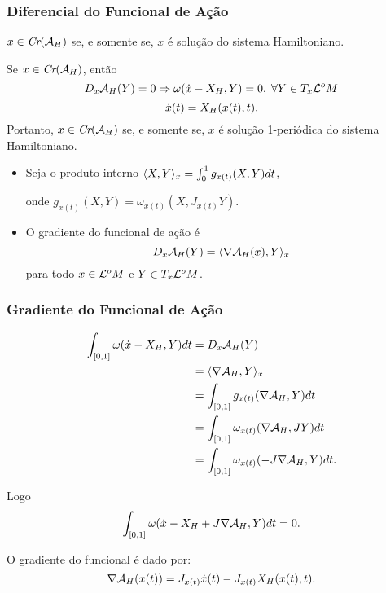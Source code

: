 \documentclass{beamer}
\begin{document}
\begin{footnotesize}
	\begin{frame}
				\frametitle{Diferencial do Funcional de Ação}
		\begin{proposicao}
			$x \in \textit{Cr}(\mathcal{A}_{H})$ se, e somente se, $x$ é solução do sistema Hamiltoniano.
		\end{proposicao}
		\begin{prova}
			Se $x \in \textit{Cr}(\mathcal{A}_{H})$, então
			$$
			D_{x}\mathcal{A}_{H}(Y) = 0 \Rightarrow \omega(\dot{x} - X_{H}, Y)=0,\; \forall Y \in T_{x}\mathcal{L}^{o}M
			$$
			$$
			\dot{x}(t) =X_{H}(x(t), t).
			$$
			Portanto, $x \in \textit{Cr}(\mathcal{A}_{H})$ se, e somente se, $x$ é solução 1-periódica do sistema Hamiltoniano. 
		\end{prova}
		\begin{itemize}
			\item 
			Seja o produto interno $ \langle X, Y \rangle_{x} = \int_{0}^{1}g_{x(t)}(X, Y)dt$, 
			
			onde $g_{x(t)}(X,Y) = \omega_{x(t)}(X,J_{x(t)}Y)$.
			
			\item O gradiente do funcional de ação é 
			$$
			D_{x}\mathcal{A}_{H}(Y) = \langle \nabla \mathcal{A}_{H}(x), Y \rangle_{x}
			$$
			para todo $x \in \mathcal{L}^{o}M$ e $Y \in T_{x}\mathcal{L}^{o}M$.
			
			
		\end{itemize}	
	\end{frame}
	
	\begin{frame}
		\frametitle{Gradiente do Funcional de Ação}
		$$
		\begin{aligned}
		\int_{[0,1]} \omega(\dot{x} - X_{H}, Y)dt&=
		D_{x}\mathcal{A}_{H}(Y)
		\\ 
		&= \langle \nabla \mathcal{A}_{H}, Y \rangle_{x}
		\\
		&= \int_{[0,1]}g_{x(t)}(\nabla \mathcal{A}_{H}, Y)dt
		\\
		&=\int_{[0,1]} \omega_{x(t)}(\nabla \mathcal{A}_{H}, JY)dt
		\\
		&=\int_{[0,1]} \omega_{x(t)}(-J\nabla \mathcal{A}_{H}, Y)dt.
		\end{aligned}
		$$
				
			
		Logo
		$$
		\int_{[0,1]} \omega(\dot{x} - X_{H} + J\nabla \mathcal{A}_{H}, Y)dt = 0.
		$$
		\begin{block}{O gradiente do funcional é dado por:}
			$$
			\nabla \mathcal{A}_{H}(x(t))= J_{x(t)}\dot{x}(t)-J_{x(t)}X_{H}(x(t), t).
			$$
		\end{block}
		

\end{frame}
\end{footnotesize}
\end{document}
